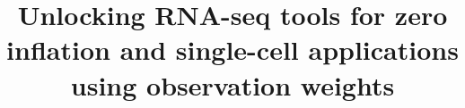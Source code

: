\documentclass{bmcart}
\begin{document}
\begin{frontmatter}

\begin{fmbox}


\title{Unlocking RNA-seq tools for zero inflation and single-cell applications using observation weights}


\author[
   addressref={aff1,aff2},                   %
   noteref={n1},                        %
   email={koen.vandenberge@ugent.be}   %
]{ }
\author[
    addressref={aff3},
       noteref={n1},
    email={fperraudeau@berkeley.edu}
]{  }
\author[
    addressref={aff4,aff5},
    email={charlotte.soneson@uzh.ch}
]{  }
\author[
    addressref={aff6},
    email={milove@email.unc.edu}
]{  }
\author[
    addressref={aff7},
    email={dar2062@med.cornell.edu}
]{  }
\author[
    addressref={aff8,aff9,aff10,aff11},
    email={jean-philippe.vert@curie.fr}
]{  }
\author[
    addressref={aff4,aff5},
    email={mark.robinson@imls.uzh.ch}
]{  }
\author[
    addressref={aff3, aff12},
    email={sandrine@stat.berkeley.edu}
]{  }
\author[
   addressref={aff1,aff2},
   corref={aff1},  
   email={lieven.clement@ugent.be}
]{ }



\end{fmbox}
\end{frontmatter}
\end{document}
